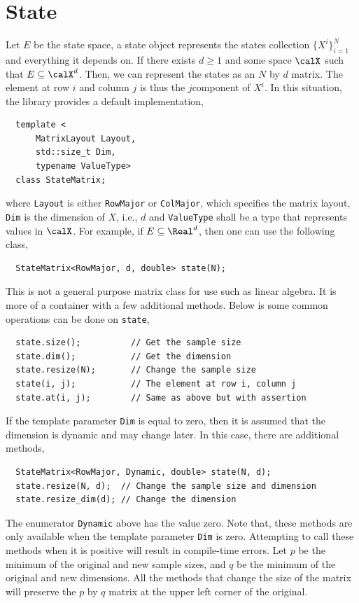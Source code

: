 \section{State}
\label{sec:State}

Let $E$ be the state space, a state object represents the states collection
$\{X^i\}_{i=1}^N$ and everything it depends on. If there exists $d\ge1$ and
some space $\calX$ such that $E\subseteq\calX^d$. Then, we can represent the
states as an $N$ by $d$ matrix. The element at row $i$ and column $j$ is thus
the $j$\ith component of $X^i$. In this situation, the library provides a
default implementation,
\begin{Verbatim}
  template <
      MatrixLayout Layout,
      std::size_t Dim,
      typename ValueType>
  class StateMatrix;
\end{Verbatim}
where \verb|Layout| is either \verb|RowMajor| or \verb|ColMajor|, which
specifies the matrix layout, \verb|Dim| is the dimension of $X$, i.e., $d$ and
\verb|ValueType| shall be a \cpp type that represents values in $\calX$. For
example, if $E\subseteq\Real^d$, then one can use the following class,
\begin{Verbatim}
  StateMatrix<RowMajor, d, double> state(N);
\end{Verbatim}
This is not a general purpose matrix class for use such as linear algebra. It
is more of a container with a few additional methods. Below is some common
operations can be done on \verb|state|,
\begin{Verbatim}
  state.size();          // Get the sample size
  state.dim();           // Get the dimension
  state.resize(N);       // Change the sample size
  state(i, j);           // The element at row i, column j
  state.at(i, j);        // Same as above but with assertion
\end{Verbatim}
If the template parameter \verb|Dim| is equal to zero, then it is assumed that
the dimension is dynamic and may change later. In this case, there are
additional methods,
\begin{Verbatim}
  StateMatrix<RowMajor, Dynamic, double> state(N, d);
  state.resize(N, d);  // Change the sample size and dimension
  state.resize_dim(d); // Change the dimension
\end{Verbatim}
The enumerator \verb|Dynamic| above has the value zero. Note that, these
methods are only available when the template parameter \verb|Dim| is zero.
Attempting to call these methods when it is positive will result in
compile-time errors. Let $p$ be the minimum of the original and new sample
sizes, and $q$ be the minimum of the original and new dimensions. All the
methods that change the size of the matrix will preserve the $p$ by $q$ matrix
at the upper left corner of the original.

